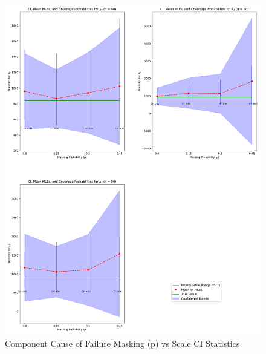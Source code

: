 \documentclass[
]{article}
\begin{document}
\begin{figure}

{\centering \includegraphics{image/plot-p-vs-stats-scale-n90} 

}

\caption{Component Cause of Failure Masking (p) vs Scale CI Statistics}\label{fig:masking-prob-vs-stats-scale}
\end{figure}
\end{document}
